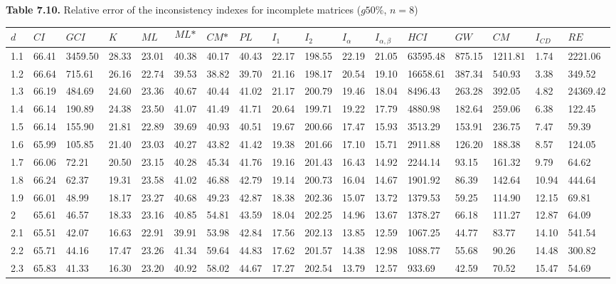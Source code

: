 \newpage
\textbf{Table 7.10.} Relative error of the inconsistency indexes for incomplete matrices ($g50\%$, $n=8$)
\begin{adjustbox}{angle=90}
  \begin{center}
    \small{    
    \begin{tabular}{|l|llllllllllllllll|}
      \hline $d$ &
$\textit{CI}$&$\textit{GCI}$&$K$&$\textit{ML}$&$$\textit{ML*}$$&$\textit{CM*}$&$\textit{PL}$&$\textit{I}_1$&$\textit{I}_2$&$\textit{I}_{\alpha}$&$\textit{I}_{\alpha,\beta}$&$\textit{HCI}$&$\textit{GW}$&$\textit{CM}$&$\textit{I}_{CD}$&$\textit{RE}$\\ \hline \hline
1.1&66.41&3459.50&28.33&23.01&40.38&40.17&40.43&22.17&198.55&22.19&21.05&63595.48&875.15&1211.81&1.74&2221.06  \\ 
1.2&66.64&715.61&26.16&22.74&39.53&38.82&39.70&21.16&198.17&20.54&19.10&16658.61&387.34&540.93&3.38&349.52  \\ 
1.3&66.19&484.69&24.60&23.36&40.67&40.44&41.02&21.17&200.79&19.46&18.04&8496.43&263.28&392.05&4.82&24369.42  \\ 
1.4&66.14&190.89&24.38&23.50&41.07&41.49&41.71&20.64&199.71&19.22&17.79&4880.98&182.64&259.06&6.38&122.45  \\ 
1.5&66.14&155.90&21.81&22.89&39.69&40.93&40.51&19.67&200.66&17.47&15.93&3513.29&153.91&236.75&7.47&59.39  \\ 
1.6&65.99&105.85&21.40&23.03&40.27&43.82&41.42&19.38&201.66&17.10&15.71&2911.88&126.20&188.38&8.57&124.05  \\ 
1.7&66.06&72.21&20.50&23.15&40.28&45.34&41.76&19.16&201.43&16.43&14.92&2244.14&93.15&161.32&9.79&64.62  \\ 
1.8&66.24&62.37&19.31&23.58&41.02&46.88&42.79&19.14&200.73&16.04&14.67&1901.92&86.39&142.64&10.94&444.64  \\ 
1.9&66.01&48.99&18.17&23.27&40.68&49.23&42.87&18.38&202.36&15.07&13.72&1379.53&59.25&114.90&12.15&69.81  \\ 
2&65.61&46.57&18.33&23.16&40.85&54.81&43.59&18.04&202.25&14.96&13.67&1378.27&66.18&111.27&12.87&64.09  \\ 
2.1&65.51&42.07&16.63&22.91&39.91&53.98&42.84&17.56&202.13&13.85&12.59&1067.25&44.77&83.77&14.10&541.54  \\ 
2.2&65.71&44.16&17.47&23.26&41.34&59.64&44.83&17.62&201.57&14.38&12.98&1088.77&55.68&90.26&14.48&300.82  \\ 
2.3&65.83&41.33&16.30&23.20&40.92&58.02&44.67&17.27&202.54&13.79&12.57&933.69&42.59&70.52&15.47&54.69  \\ 

\end{tabular}}
\end{center}
\end{adjustbox}

